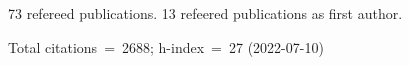 73 refereed publications. 13 refeered publications as first author.

Total citations~=~2688; h-index~=~27 (2022-07-10)